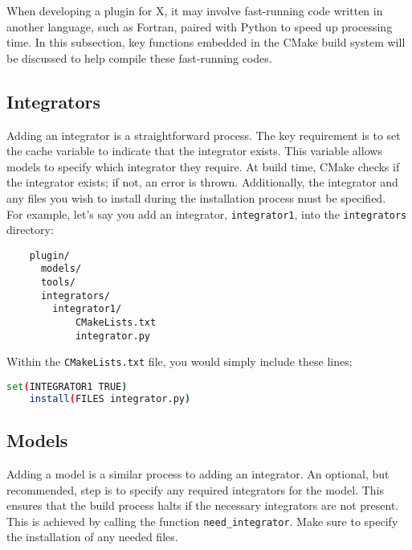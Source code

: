 \documentclass[a4paper,12pt]{article}
\begin{document}
When developing a plugin for X, it may involve fast-running code written in another language, such as Fortran, paired with Python to speed up processing time. In this subsection, key functions embedded in the CMake build system will be discussed to help compile these fast-running codes. \\

\subsection{Integrators}

Adding an integrator is a straightforward process. The key requirement is to set the cache variable to indicate that the integrator exists. This variable allows models to specify which integrator they require. At build time, CMake checks if the integrator exists; if not, an error is thrown. Additionally, the integrator and any files you wish to install during the installation process must be specified. \\

For example, let's say you add an integrator, \texttt{integrator1}, into the \texttt{integrators} directory:

\begin{verbatim}
    plugin/
      models/
      tools/
      integrators/
        integrator1/
            CMakeLists.txt 
            integrator.py 
\end{verbatim}

Within the \texttt{CMakeLists.txt} file, you would simply include these lines:

\vspace{1em}
\begin{lstlisting}[language=bash]
    set(INTEGRATOR1 TRUE)
    install(FILES integrator.py)
\end{lstlisting}
\vspace{1em}

\subsection{Models}

Adding a model is a similar process to adding an integrator. An optional, but recommended, step is to specify any required integrators for the model. This ensures that the build process halts if the necessary integrators are not present. This is achieved by calling the function \texttt{need\_integrator}. Make sure to specify the installation of any needed files. \\
\end{document}
